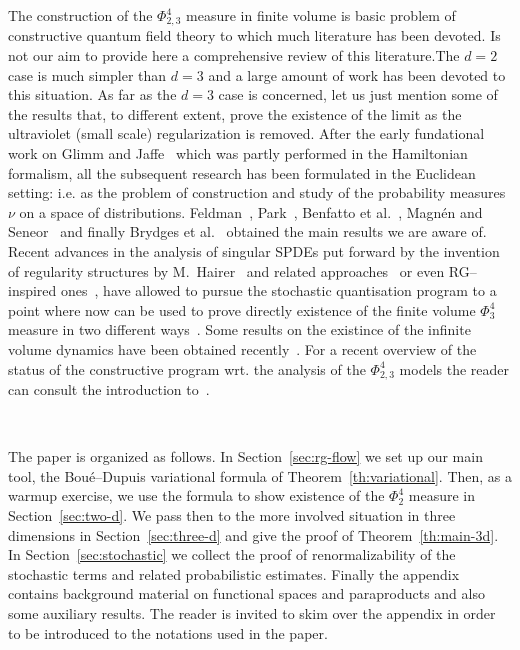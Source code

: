 \documentclass[11pt, oneside]{article}   	%
\begin{document}
The construction of the $\Phi^4_{2, 3}$ measure in finite volume is basic
problem of constructive quantum field theory to which much literature has been
devoted. Is not our aim to provide here a comprehensive review of this
literature.The $d = 2$ case is much simpler than $d = 3$ and a large amount of
work has been devoted to this situation. As far as the $d = 3$ case is
concerned, let us just mention some of the results that, to different extent,
prove the existence of the limit as the ultraviolet (small scale)
regularization is removed. After the early fundational work on Glimm and
Jaffe~{\cite{glimm_boson_1968,glimm_positivity_1973}} which was partly
performed in the Hamiltonian formalism, all the subsequent research has been
formulated in the Euclidean setting: i.e. as the problem of construction and
study of the probability measures $\nu$ on a space of distributions.
Feldman~{\cite{feldman_lambda_1974}}, Park~{\cite{park_lambda_1975}}, Benfatto
et al.~{\cite{benfatto_ultraviolet_1980}}, Magn{\'e}n and
Seneor~{\cite{magnen_infinite_1976}} and finally Brydges et
al.~{\cite{brydges_new_1983}} obtained the main results we are aware of.
Recent advances in the analysis of singular SPDEs put forward by the invention
of regularity structures by M.~Hairer~{\cite{hairer_theory_2014}} and related
approaches~{\cite{gubinelli_paracontrolled_2015,catellier_paracontrolled_2013,otto_quasilinear_2016}}
or even RG--inspired ones~{\cite{kupiainen_renormalization_2016}}, have
allowed to pursue the stochastic quantisation program to a point where now can
be used to prove directly existence of the finite volume $\Phi^4_3$ measure in
two different ways~{\cite{mourrat_dynamic_2016,albeverio_invariant_2017}}.
Some results on the existince of the infinite volume dynamics have been
obtained recently~{\cite{gubinelli_global_2018}}. For a recent overview of the
status of the constructive program wrt. the analysis of the $\Phi^4_{2, 3}$
models the reader can consult the introduction
to~{\cite{albeverio_invariant_2017}}.

\

The paper is organized as follows. In Section~\ref{sec:rg-flow} we set up our
main tool, the Bou{\'e}--Dupuis variational formula of
Theorem~\ref{th:variational}. Then, as a warmup exercise, we use the formula
to show existence of the $\Phi^4_2$ measure in Section~\ref{sec:two-d}. We
pass then to the more involved situation in three dimensions in
Section~\ref{sec:three-d} and give the proof of Theorem~\ref{th:main-3d}. In
Section~\ref{sec:stochastic} we collect the proof of renormalizability of the
stochastic terms and related probabilistic estimates. Finally the appendix
contains background material on functional spaces and paraproducts and also
some auxiliary results. The reader is invited to skim over the appendix in
order to be introduced to the notations used in the paper.
\end{document}
